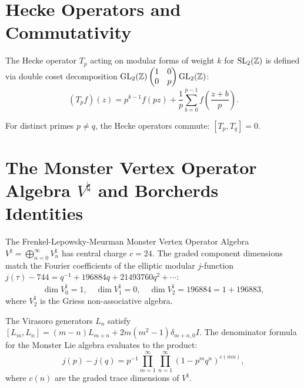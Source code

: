 \section{Hecke Operators and Commutativity}

\begin{definition}
\label{def:hecke_operator}
\leanok
The Hecke operator $T_p$ acting on modular forms of weight $k$ for $\mathrm{SL}_2(\mathbb{Z})$ is defined via double coset decomposition $\mathrm{GL}_2(\mathbb{Z}) \begin{pmatrix} 1 & 0 \\ 0 & p \end{pmatrix} \mathrm{GL}_2(\mathbb{Z})$:
\[
(T_p f)(z) = p^{k-1} f(p z) + \frac{1}{p} \sum_{b=0}^{p-1} f\left(\frac{z + b}{p}\right).
\]
\end{definition}

\begin{theorem}
\label{thm:hecke_commute}
\leanok
For distinct primes $p \neq q$, the Hecke operators commute: $[T_p, T_q] = 0$.
\end{theorem}

\section{The Monster Vertex Operator Algebra $V^\natural$ and Borcherds Identities}

\begin{definition}
\label{def:monster_voa}
\leanok
The Frenkel-Lepowsky-Meurman Monster Vertex Operator Algebra $V^\natural = \bigoplus_{n=0}^\infty V_n^\natural$ has central charge $c = 24$. The graded component dimensions match the Fourier coefficients of the elliptic modular $j$-function $j(\tau) - 744 = q^{-1} + 196884 q + 21493760 q^2 + \cdots$:
\[
\dim V_0^\natural = 1, \quad \dim V_1^\natural = 0, \quad \dim V_2^\natural = 196884 = 1 + 196883,
\]
where $V_2^\natural$ is the Griess non-associative algebra.
\end{definition}

\begin{theorem}
\label{thm:monster_borcherds_product}
\leanok
The Virasoro generators $L_n$ satisfy $[L_m, L_n] = (m - n) L_{m+n} + 2 m (m^2 - 1) \delta_{m+n, 0} I$. The denominator formula for the Monster Lie algebra evaluates to the product:
\[
j(p) - j(q) = p^{-1} \prod_{m=1}^\infty \prod_{n=1}^\infty (1 - p^m q^n)^{c(m n)},
\]
where $c(n)$ are the graded trace dimensions of $V^\natural$.
\end{theorem}

